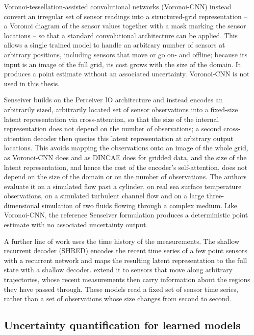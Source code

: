 \documentclass[english, 12pt, a4paper, elec, utf8, a-2b, online]{aaltothesis}
\begin{document}
Voronoi-tessellation-assisted convolutional networks (Voronoi-CNN)
\cite{fukami2021voronoi} instead convert an irregular set of sensor
readings into a structured-grid representation -- a Voronoi diagram
of the sensor values together with a mask marking the sensor
locations -- so that a standard convolutional architecture can be
applied. This allows a single trained model to handle an arbitrary number of
sensors at arbitrary positions, including sensors that move or go on-
and offline; because its input is an image of the full grid, its cost
grows with the size of the domain. It produces a point estimate
without an associated uncertainty. Voronoi-CNN is not used in this
thesis.

Senseiver \cite{santos2023senseiver} builds on the Perceiver IO
architecture \cite{jaegle2021perceiver} and instead encodes an
arbitrarily sized, arbitrarily located set of sensor observations
into a fixed-size latent representation via cross-attention, so that
the size of the internal representation does not depend on the
number of observations; a second cross-attention decoder then
queries this latent representation at arbitrary output locations.
This avoids mapping the observations onto an image of the whole grid, as
Voronoi-CNN does and as DINCAE does for gridded data, and the size of the latent representation, and hence the cost
of the encoder's self-attention, does not depend on the size of the
domain or on the number of observations. The authors evaluate it on a simulated flow past a cylinder, on real
sea surface temperature observations, on a simulated turbulent channel flow and
on a large three-dimensional simulation of two fluids flowing through a complex
medium. Like Voronoi-CNN, the reference Senseiver
formulation produces a deterministic point estimate with no
associated uncertainty output.

A further line of work uses the time history of the measurements. The shallow recurrent
decoder (SHRED) \cite{williams2024shred} encodes the recent time series of a few point sensors
with a recurrent network and maps the resulting latent representation to the
full state with a shallow decoder. \citeauthor{ebers2024mobileshred}
\cite{ebers2024mobileshred} extend it to sensors that move along arbitrary
trajectories, whose recent measurements then carry information about the
regions they have passed through. These models read a fixed set of sensor
time series, rather than a set of observations whose size changes from second
to second.

\subsection{Uncertainty quantification for learned models}
\label{sec:rw_uq}
\end{document}

